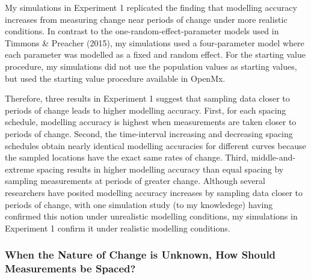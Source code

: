\documentclass[
12pt, %
twoside,
english]{guelphthesis}
\theoremstyle{definition}
\theoremstyle{definition}
\theoremstyle{definition}
\theoremstyle{definition}
\theoremstyle{remark}
\begin{document}
My simulations in Experiment 1 replicated the finding that modelling accuracy increases from measuring change near periods of change under more realistic conditions. In contrast to the one-random-effect-parameter models used in Timmons \& Preacher (2015), my simulations used a four-parameter model where each parameter was modelled as a fixed and random effect. For the starting value procedure, my simulations did not use the population values as starting values, but used the starting value procedure available in OpenMx.

Therefore, three results in Experiment 1 suggest that sampling data closer to periods of change leads to higher modelling accuracy. First, for each spacing schedule, modelling accuracy is highest when measurements are taken closer to periods of change. Second, the time-interval increasing and decreasing spacing schedules obtain nearly identical modelling accuracies for different curves because the sampled locations have the exact same rates of change. Third, middle-and-extreme spacing results in higher modelling accuracy than equal spacing by sampling measurements at periods of greater change. Although several researchers have posited modelling accuracy increases by sampling data closer to periods of change, with one simulation study (to my knowledege) having confirmed this notion under unrealistic modelling conditions, my simulations in Experiment 1 confirm it under realistic modelling conditions.

\hypertarget{when-the-nature-of-change-is-unknown-how-should-measurements-be-spaced}{%
\subsubsection{When the Nature of Change is Unknown, How Should Measurements be Spaced?}\label{when-the-nature-of-change-is-unknown-how-should-measurements-be-spaced}}
\end{document}

